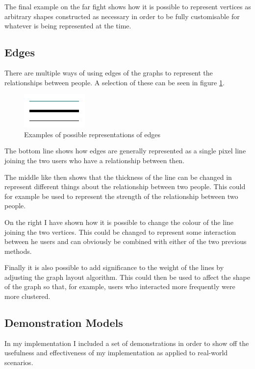 \documentclass[12pt,a4paper]{article}
\begin{document}
The final example on the far fight shows how it is possible to represent vertices as arbitrary shapes constructed as necessary in order to be fully customisable for whatever is being represented at the time.

\subsection{Edges}

There are multiple ways of using edges of the graphs to represent the relationships between people. A selection of these can be seen in figure \ref{fig:edges}.

\begin{figure}[htb]
\caption{Examples of possible representations of edges}
\label{fig:edges}
\centering
\includegraphics[scale=1]{Edges.png}
\end{figure}

The bottom line shows how edges are generally represented as a single pixel line joining the two users who have a relationship between then.

The middle like then shows that the thickness of the line can be changed in represent different things about the relationship between two people. This could for example be used to represent the strength of the relationship between two people.

On the right I have shown how it is possible to change the colour of the line joining the two vertices. This could be changed to represent some interaction between he users and can obviously be combined with either of the two previous methods.

Finally it is also possible to add significance to the weight of the lines by adjusting the graph layout algorithm. This could then be used to affect the shape of the graph so that, for example, users who interacted more frequently were more clustered.

\subsection{Demonstration Models}

In my implementation I included a set of demonstrations in order to show off the usefulness and effectiveness of my implementation as applied to real-world scenarios.
\end{document}
